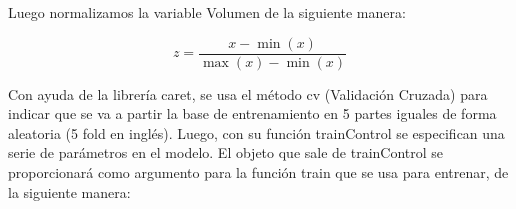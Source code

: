 \documentclass[
]{article}
\newenvironment{Shaded}{\begin{snugshade}}{\end{snugshade}}
\newcommand{\CommentTok}[1]{\textcolor[rgb]{0.56,0.35,0.01}{\textit{#1}}}
\newcommand{\DataTypeTok}[1]{\textcolor[rgb]{0.13,0.29,0.53}{#1}}
\newcommand{\DecValTok}[1]{\textcolor[rgb]{0.00,0.00,0.81}{#1}}
\newcommand{\KeywordTok}[1]{\textcolor[rgb]{0.13,0.29,0.53}{\textbf{#1}}}
\newcommand{\NormalTok}[1]{#1}
\newcommand{\OperatorTok}[1]{\textcolor[rgb]{0.81,0.36,0.00}{\textbf{#1}}}
\newcommand{\StringTok}[1]{\textcolor[rgb]{0.31,0.60,0.02}{#1}}
\begin{document}
Luego normalizamos la variable Volumen de la siguiente manera:

\[
z=\frac{x-\min (x)}{\max (x)-\min (x)}
\]

\begin{Shaded}
\end{Shaded}

Con ayuda de la librería caret, se usa el método cv (Validación Cruzada)
para indicar que se va a partir la base de entrenamiento en 5 partes
iguales de forma aleatoria (5 fold en inglés). Luego, con su función
trainControl se especifican una serie de parámetros en el modelo. El
objeto que sale de trainControl se proporcionará como argumento para la
función train que se usa para entrenar, de la siguiente manera:

\begin{Shaded}
\end{Shaded}
\end{document}

